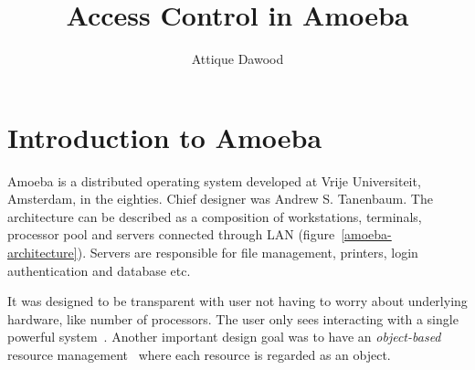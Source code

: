 \documentclass{sig-alternate-10pt}
\begin{document}
\title{Access Control in Amoeba}
\author{Attique Dawood}
\maketitle

\section{Introduction to Amoeba}

Amoeba is a distributed operating system developed at Vrije Universiteit, Amsterdam, in the eighties. Chief designer was Andrew S. Tanenbaum. The architecture can be described as a composition of workstations, terminals, processor pool and servers connected through LAN (figure~\ref{amoeba-architecture}). Servers are responsible for file management, printers, login authentication and database etc.

It was designed to be transparent with user not having to worry about underlying hardware, like number of processors. The user only sees interacting with a single powerful system~\cite{amoeba-sourceforge}. Another important design goal was to have an \emph{object-based} resource management~\cite{distributed-systems-coulouris} where each resource is regarded as an object.
\end{document}
